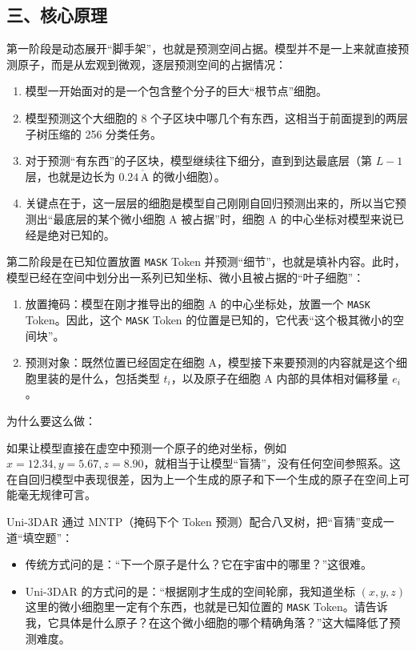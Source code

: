 \hypertarget{ux4e09ux6838ux5fc3ux539fux7406}{%
\subsection{三、核心原理}\label{ux4e09ux6838ux5fc3ux539fux7406}}

第一阶段是动态展开``脚手架''，也就是预测空间占据。模型并不是一上来就直接预测原子，而是从宏观到微观，逐层预测空间的占据情况：

\begin{enumerate}
\def\labelenumi{\arabic{enumi}.}
\tightlist
\item
  模型一开始面对的是一个包含整个分子的巨大``根节点''细胞。
\item
  模型预测这个大细胞的 8 个子区块中哪几个有东西，这相当于前面提到的两层子树压缩的 256 分类任务。
\item
  对于预测``有东西''的子区块，模型继续往下细分，直到到达最底层（第 \(L-1\) 层，也就是边长为 \(0.24\,\mathrm{\mathring{A}}\) 的微小细胞）。
\item
  关键点在于，这一层层的细胞是模型自己刚刚自回归预测出来的，所以当它预测出``最底层的某个微小细胞 A 被占据''时，细胞 A 的中心坐标对模型来说已经是绝对已知的。
\end{enumerate}

第二阶段是在已知位置放置 \texttt{MASK} Token 并预测``细节''，也就是填补内容。此时，模型已经在空间中划分出一系列已知坐标、微小且被占据的``叶子细胞''：

\begin{enumerate}
\def\labelenumi{\arabic{enumi}.}
\tightlist
\item
  放置掩码：模型在刚才推导出的细胞 A 的中心坐标处，放置一个 \texttt{MASK} Token。因此，这个 \texttt{MASK} Token 的位置是已知的，它代表``这个极其微小的空间块''。
\item
  预测对象：既然位置已经固定在细胞 A，模型接下来要预测的内容就是这个细胞里装的是什么，包括类型 \(t_i\)，以及原子在细胞 A 内部的具体相对偏移量 \(e_i\)。
\end{enumerate}

为什么要这么做：

如果让模型直接在虚空中预测一个原子的绝对坐标，例如 \(x = 12.34, y = 5.67, z = 8.90\)，就相当于让模型``盲猜''，没有任何空间参照系。这在自回归模型中表现很差，因为上一个生成的原子和下一个生成的原子在空间上可能毫无规律可言。

Uni-3DAR 通过 MNTP（掩码下个 Token 预测）配合八叉树，把``盲猜''变成一道``填空题''：

\begin{itemize}
\tightlist
\item
  传统方式问的是：``下一个原子是什么？它在宇宙中的哪里？''这很难。
\item
  Uni-3DAR 的方式问的是：``根据刚才生成的空间轮廓，我知道坐标 \((x,y,z)\) 这里的微小细胞里一定有个东西，也就是已知位置的 \texttt{MASK} Token。请告诉我，它具体是什么原子？在这个微小细胞的哪个精确角落？''这大幅降低了预测难度。
\end{itemize}

